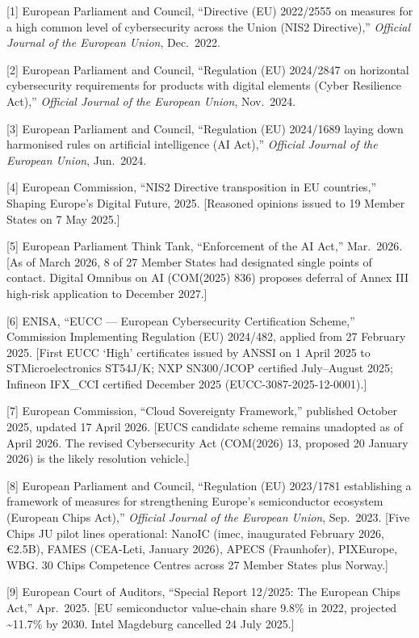 \documentclass{ieeeaccess}
\begin{document}
{[}1{]} European Parliament and Council, ``Directive (EU) 2022/2555 on
measures for a high common level of cybersecurity across the Union (NIS2
Directive),'' \emph{Official Journal of the European Union}, Dec.~2022.

{[}2{]} European Parliament and Council, ``Regulation (EU) 2024/2847 on
horizontal cybersecurity requirements for products with digital elements
(Cyber Resilience Act),'' \emph{Official Journal of the European Union},
Nov.~2024.

{[}3{]} European Parliament and Council, ``Regulation (EU) 2024/1689
laying down harmonised rules on artificial intelligence (AI Act),''
\emph{Official Journal of the European Union}, Jun.~2024.

{[}4{]} European Commission, ``NIS2 Directive transposition in EU
countries,'' Shaping Europe's Digital Future, 2025. {[}Reasoned opinions
issued to 19 Member States on 7 May 2025.{]}

{[}5{]} European Parliament Think Tank, ``Enforcement of the AI Act,''
Mar.~2026. {[}As of March 2026, 8 of 27 Member States had designated
single points of contact. Digital Omnibus on AI (COM(2025) 836) proposes
deferral of Annex III high-risk application to December 2027.{]}

{[}6{]} ENISA, ``EUCC --- European Cybersecurity Certification Scheme,''
Commission Implementing Regulation (EU) 2024/482, applied from 27
February 2025. {[}First EUCC `High' certificates issued by ANSSI on 1
April 2025 to STMicroelectronics ST54J/K; NXP SN300/JCOP certified
July--August 2025; Infineon IFX\_CCI certified December 2025
(EUCC-3087-2025-12-0001).{]}

{[}7{]} European Commission, ``Cloud Sovereignty Framework,'' published
October 2025, updated 17 April 2026. {[}EUCS candidate scheme remains
unadopted as of April 2026. The revised Cybersecurity Act (COM(2026) 13,
proposed 20 January 2026) is the likely resolution vehicle.{]}

{[}8{]} European Parliament and Council, ``Regulation (EU) 2023/1781
establishing a framework of measures for strengthening Europe's
semiconductor ecosystem (European Chips Act),'' \emph{Official Journal
of the European Union}, Sep.~2023. {[}Five Chips JU pilot lines
operational: NanoIC (imec, inaugurated February 2026, €2.5B), FAMES
(CEA-Leti, January 2026), APECS (Fraunhofer), PIXEurope, WBG. 30 Chips
Competence Centres across 27 Member States plus Norway.{]}

{[}9{]} European Court of Auditors, ``Special Report 12/2025: The
European Chips Act,'' Apr.~2025. {[}EU semiconductor value-chain share
9.8\% in 2022, projected \textasciitilde11.7\% by 2030. Intel Magdeburg
cancelled 24 July 2025.{]}
\end{document}
